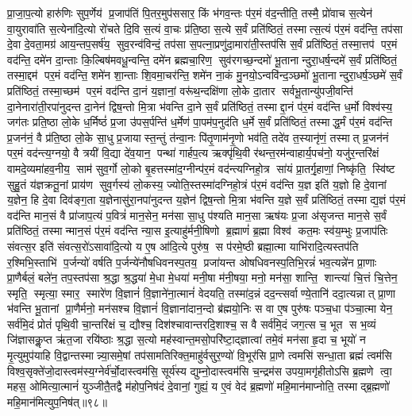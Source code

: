 प्रा॒जा॒प॒त्यो हारु॑णिः सुप॒र्णेय॑ प्र॒जाप॑तिं पि॒तर॒मुप॑ससार॒ किं भ॑गव॒न्तः प॑र॒मं व॑द॒न्तीति॒ तस्मै॒ प्रो॑वाच स॒त्येन॑ वा॒युरावा॑ति स॒त्येना॑दि॒त्यो रो॑चते दि॒वि स॒त्यं वा॒चः प्र॑ति॒ष्ठा स॒त्ये स॒र्वं प्रति॑ष्ठितं॒ तस्मात्स॒त्यं प॑र॒मं वद॑न्ति॒ तप॑सा दे॒वा दे॒वता॒मग्र॑ आय॒न्तप॒सर्\mbox{}ष॑य॒ सुव॒रन्व॑विन्दं॒ तप॑सा स॒पत्ना॒प्रणु॑दा॒मारा॑ती॒स्तप॑सि स॒र्वं प्रति॑ष्ठितं॒ तस्मा॒त्तप॑ पर॒मं वद॑न्ति॒ दमे॑न दा॒न्ताः कि॒ल्बिष॑मवधू॒न्वन्ति॒ दमे॑न ब्रह्मचा॒रिण॒ सुव॑रगच्छ॒न्दमो॑ भू॒तानान्दुरा॒धर्\mbox{}ष॒न्दमे॑ स॒र्वं प्रति॑ष्ठितं॒ तस्मा॒द्दम॑ पर॒मं वद॑न्ति॒ शमे॑न शा॒न्ताः  शि॒वमा॒चर॑न्ति॒ शमे॑न ना॒कं मु॒नयो॒ऽन्ववि॑न्द॒ञ्छमो॑ भू॒तानान्दुरा॒धर्\mbox{}ष॒ञ्छमे॑ स॒र्वं प्रति॑ष्ठितं॒ तस्मा॒च्छम॑ पर॒मं वद॑न्ति दा॒नं य॒ज्ञानां॒ वरू॑थ॒न्दक्षि॑णा लो॒के दा॒तार सर्वभू॒तान्यु॑पजी॒वन्ति॑ दा॒नेनारा॑ती॒रपा॑नुदन्त दा॒नेन॑ द्विष॒न्तो मि॒त्रा भ॑वन्ति दा॒ने स॒र्वं प्रति॑ष्ठितं॒ तस्माद्दा॒नं प॑र॒मं वद॑न्ति ध॒र्मो विश्व॑स्य॒ जग॑तः प्रति॒ष्ठा लो॒के ध॒र्मिष्ठं॑ प्र॒जा उ॑पस॒र्पन्ति॑ ध॒र्मेण॑ पा॒पम॑प॒नुद॑ति ध॒र्मे स॒र्वं प्रति॑ष्ठितं॒ तस्माद्ध॒र्मं प॑र॒मं वद॑न्ति प्र॒जन॑नं॒ वै प्र॑ति॒ष्ठा लो॒के सा॒धु प्र॒जायास्त॒न्तुं त॑न्वा॒नः पि॑तृ॒णाम॑नृ॒णो भव॑ति॒ तदे॑व त॒स्यानृ॑णं॒ तस्मात् प्र॒जन॑नं पर॒मं वद॑न्त्य॒ग्नयो॒ वै त्रयी॑ वि॒द्या दे॑व॒यान॒ पन्था॑ गार्\mbox{}हप॒त्य ऋक्पृ॑थि॒वी र॑थन्त॒रम॑न्वाहार्य॒पच॑नो॒ यजु॑र॒न्तरि॑क्षं वामदे॒व्यमा॑हव॒नीय॒ साम॑ सुव॒र्गो लो॒को बृ॒हत्तस्मा॑द॒ग्नीन्प॑र॒मं वद॑न्त्यग्निहो॒त्र सा॑यं प्रा॒तर्गृ॒हाणां॒ निष्कृ॑ति॒ स्वि॑ष्ट सुहु॒तं य॑ज्ञक्रतू॒नां प्राय॑ण सुव॒र्गस्य॑ लो॒कस्य॒ ज्योति॒स्तस्मा॑दग्निहो॒त्रं प॑र॒मं वद॑न्ति य॒ज्ञ इति॑ य॒ज्ञो हि दे॒वानां य॒ज्ञेन॒ हि दे॒वा दिव॑ङ्ग॒ता य॒ज्ञेनासु॑रा॒नपा॑नुदन्त य॒ज्ञेन॑ द्विष॒न्तो मि॒त्रा भ॑वन्ति य॒ज्ञे स॒र्वं प्रति॑ष्ठितं॒ तस्माद्य॒ज्ञं प॑र॒मं वद॑न्ति मान॒सं वै प्रा॑जाप॒त्यं प॒वित्रं॑ मान॒सेन॒ मन॑सा सा॒धु प॑श्यति मान॒सा ऋष॑यः प्र॒जा अ॑सृजन्त मान॒से स॒र्वं प्रति॑ष्ठितं॒ तस्मान्मान॒सं प॑र॒मं वद॑न्ति न्या॒स इ॒त्याहु॑र्मनी॒षिणो ब्र॒ह्माणं॑ ब्र॒ह्मा विश्व॑ कत॒मः स्व॑य॒म्भुः प्र॒जाप॑तिः संवत्स॒र इति॑ संवत्स॒रो॑ऽसावा॑दि॒त्यो य ए॒ष आ॑दि॒त्ये पुरु॑ष॒ स प॑रमे॒ष्ठी ब्रह्मा॒त्मा याभि॑रादि॒त्यस्तप॑ति र॒श्मिभि॒स्ताभि॑ प॒र्जन्यो॑ वर्\mbox{}षति प॒र्जन्ये॑नौषधिवनस्प॒तय॒ प्रजा॑यन्त ओषधिवनस्प॒तिभि॒रन्नं॑ भव॒त्यन्ने॑न प्रा॒णाः प्रा॒णैर्बलं॒ बले॑न॒ तप॒स्तप॑सा श्र॒द्धा श्र॒द्धया॑ मे॒धा मे॒धया॑ मनी॒षा म॑नी॒षया॒ मनो॒ मन॑सा॒ शान्ति॒ शान्त्या॑ चि॒त्तं चि॒त्तेन॒ स्मृति॒ स्मृत्या॒ स्मार॒ स्मारे॑ण वि॒ज्ञानं॑  वि॒ज्ञाने॑ना॒त्मानं॑ वेदयति॒ तस्मा॑द॒न्नं दद॒न्त्सर्वाण्ये॒तानि॑ ददा॒त्यन्नात् प्रा॒णा भ॑वन्ति भू॒तानां प्रा॒णैर्मनो॒ मन॑सश्च वि॒ज्ञानं॑  वि॒ज्ञाना॑दान॒न्दो ब्र॑ह्मयो॒निः स वा ए॒ष पुरु॑षः पञ्च॒धा प॑ञ्चा॒त्मा येन॒ सर्व॑मि॒दं प्रोतं॑ पृथि॒वी चा॒न्तरि॑क्षं च॒ द्यौश्च॒ दिश॑श्चावान्तरदि॒शाश्च॒ स वै सर्व॑मि॒दं जग॒त्स च॒ भूत स भ॒व्यं जि॑ज्ञासकॢ॒प्त ऋ॑त॒जा रयि॑ष्ठाः  श्र॒द्धा स॒त्यो मह॑स्वान्त॒मसो॒परि॑ष्टा॒द्ज्ञात्वा॑ तमे॒वं मन॑सा हृ॒दा च॒ भूयो॑ न मृ॒त्युमुप॑याहि वि॒द्वान्तस्मान्न्या॒समे॒षां तप॑सामतिरिक्त॒माहु॑र्वसुर॒ण्यो॑ वि॒भूर॑सि प्रा॒णे त्वमसि॑ सन्धा॒ता ब्रह्मं॑ त्वम॑सि विश्व॒सृक्ते॑जो॒दास्त्वम॑स्य॒ग्नेर्व॑र्चो॒दास्त्वम॑सि॒ सूर्य॑स्य द्युम्नो॒दास्त्वम॑सि च॒न्द्रम॑स उपया॒मगृ॑हीतोऽसि ब्र॒ह्मणे त्वा॒ महस॒ ओमित्या॒त्मानं॑ युञ्जीतै॒तद्वै म॑होप॒निष॑दं दे॒वानां॒ गुह्यं॒ य ए॒वं वेद॑ ब्र॒ह्मणो॑ महि॒मान॑माप्नोति॒ तस्माद्ब्र॒ह्मणो॑ महि॒मान॑मित्युप॒निष॑त्॥९८॥\anuvakamend



